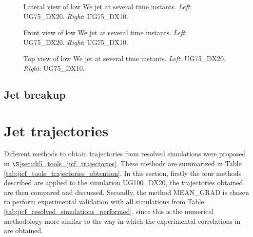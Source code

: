 \clearpage

\begin{figure}[ht]
\centering
{}
\caption[Lateral view of low We jet at several time instants. ]{Lateral view of low We jet at several time instants. \textsl{Left}: UG75\_DX20. \textsl{Right}: UG75\_DX10.}
\label{fig:JICF_establishment_UG75_lateral}
\end{figure}

\clearpage

\begin{figure}[ht]
\centering
{}
\caption[Front view of low We jet at several time instants. ]{Front view of low We jet at several time instants. \textsl{Left}: UG75\_DX20. \textsl{Right}: UG75\_DX10.}
\label{fig:JICF_establishment_UG75_front}
\end{figure}

\clearpage

\begin{figure}[ht]
\centering
{}
\caption[Top view of low We jet at several time instants. ]{Top view of low We jet at several time instants. \textsl{Left}: UG75\_DX20. \textsl{Right}: UG75\_DX10.}
\label{fig:JICF_establishment_UG75_top}
\end{figure}

\clearpage

\subsection{Jet breakup}


\section{Jet trajectories}
\label{subsec:ch5_jet_trajectories_results}

Different methods to obtain trajectories from resolved simulations were proposed in $\S$\ref{sec:ch5_tools_jicf_trajectories}. These methods are summarized in Table \ref{tab:jicf_tools_trajectories_obtention}. In this section, firstly  the four methods described are applied to the simulation UG100\_DX20, the trajectories obtained are then compared and discussed. Secondly, the method MEAN\_GRAD is chosen to perform experimental validation with all simulations from Table \ref{tab:jicf_resolved_simulations_performed}, since this is the numerical methodology more similar to the way in which the experimental correlations in  are obtained.

